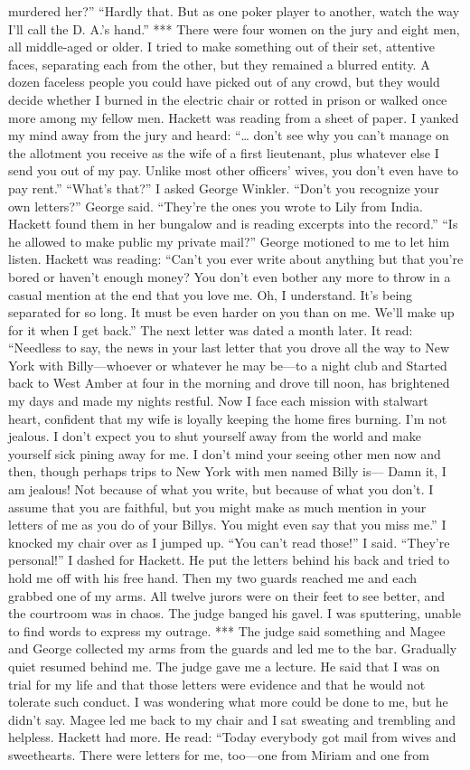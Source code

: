 \documentclass{novel}
\begin{document}
murdered her?” “Hardly that. But as one poker player to another, watch the way I’ll call the D. A.’s hand.” *** There were four women on the jury and eight men, all middle-aged or older. I tried to make something out of their set, attentive faces, separating each from the other, but they remained a blurred entity. A dozen faceless people you could have picked out of any crowd, but they would decide whether I burned in the electric chair or rotted in prison or walked once more among my fellow men. Hackett was reading from a sheet of paper. I yanked my mind away from the jury and heard: “… don’t see why you can’t manage on the allotment you receive as the wife of a first lieutenant, plus whatever else I send you out of my pay. Unlike most other officers’ wives, you don’t even have to pay rent.” “What’s that?” I asked George Winkler. “Don’t you recognize your own letters?” George said. “They’re the ones you wrote to Lily from India. Hackett found them in her bungalow and is reading excerpts into the record.” “Is he allowed to make public my private mail?” George motioned to me to let him listen. Hackett was reading: “Can’t you ever write about anything but that you’re bored or haven’t enough money? You don’t even bother any more to throw in a casual mention at the end that you love me. Oh, I understand. It’s being separated for so long. It must be even harder on you than on me. We’ll make up for it when I get back.” The next letter was dated a month later. It read: “Needless to say, the news in your last letter that you drove all the way to New York with Billy—whoever or whatever he may be—to a night club and Started back to West Amber at four in the morning and drove till noon, has brightened my days and made my nights restful. Now I face each mission with stalwart heart, confident that my wife is loyally keeping the home fires burning. I’m not jealous. I don’t expect you to shut yourself away from the world and make yourself sick pining away for me. I don’t mind your seeing other men now and then, though perhaps trips to New York with men named Billy is— Damn it, I am jealous! Not because of what you write, but because of what you don’t. I assume that you are faithful, but you might make as much mention in your letters of me as you do of your Billys. You might even say that you miss me.” I knocked my chair over as I jumped up. “You can’t read those!” I said. “They’re personal!” I dashed for Hackett. He put the letters behind his back and tried to hold me off with his free hand. Then my two guards reached me and each grabbed one of my arms. All twelve jurors were on their feet to see better, and the courtroom was in chaos. The judge banged his gavel. I was sputtering, unable to find words to express my outrage. *** The judge said something and Magee and George collected my arms from the guards and led me to the bar. Gradually quiet resumed behind me. The judge gave me a lecture. He said that I was on trial for my life and that those letters were evidence and that he would not tolerate such conduct. I was wondering what more could be done to me, but he didn’t say. Magee led me back to my chair and I sat sweating and trembling and helpless. Hackett had more. He read: “Today everybody got mail from wives and sweethearts. There were letters for me, too—one from Miriam and one from 
\end{document}
